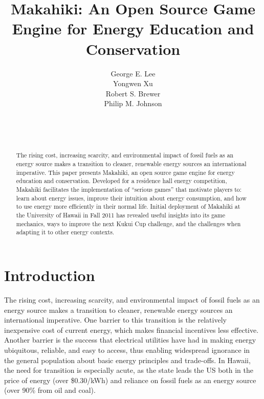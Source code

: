 \documentclass{acm_proc_article-sp}
\begin{document}
\title{Makahiki: An Open Source Game Engine for Energy Education and Conservation}


\author{
\smallskip
George E. Lee\\ 
\smallskip
Yongwen Xu\\ 
\smallskip
Robert S. Brewer\\ 
\smallskip
Philip M. Johnson\\
       \\
       \\
       \\
}

\maketitle
\begin{abstract}
  The rising cost, increasing scarcity, and environmental impact of fossil
  fuels as an energy source makes a transition to cleaner, renewable energy
  sources an international imperative.  This paper presents Makahiki, an open
  source game engine for energy education and conservation. Developed for a
  residence hall energy competition, Makahiki facilitates the implementation of
  ``serious games'' that motivate players to: learn about energy issues,
  improve their intuition about energy consumption, and how to use energy more
  efficiently in their normal life.  Initial deployment of Makahiki at the
  University of Hawaii in Fall 2011 has revealed useful insights into its game
  mechanics, ways to improve the next Kukui Cup challenge, and the challenges
  when adapting it to other energy contexts.
\end{abstract}




\section{Introduction}

The rising cost, increasing scarcity, and environmental impact of fossil fuels
as an energy source makes a transition to cleaner, renewable energy sources an
international imperative.  One barrier to this transition is the relatively
inexpensive cost of current energy, which makes financial incentives less
effective. Another barrier is the success that electrical utilities have had in
making energy ubiquitous, reliable, and easy to access, thus enabling
widespread ignorance in the general population about basic energy principles
and trade-offs.  In Hawaii, the need for transition is especially acute, as the
state leads the US both in the price of energy (over \$0.30/kWh) and
reliance on fossil fuels as an energy source (over 90\% from oil and coal).
\end{document}
